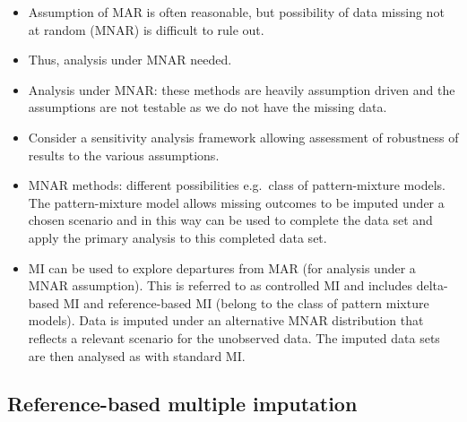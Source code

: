 \documentclass[
  letterpaper,
  DIV=11,
  numbers=noendperiod]{scrreprt}
\providecommand{\tightlist}{%
  \setlength{\itemsep}{0pt}\setlength{\parskip}{0pt}}\usepackage{longtable,booktabs,array}
\begin{document}
\begin{itemize}
\tightlist
\item
  Assumption of MAR is often reasonable, but possibility of data missing
  not at random (MNAR) is difficult to rule out.
\item
  Thus, analysis under MNAR needed.
\item
  Analysis under MNAR: these methods are heavily assumption driven and
  the assumptions are not testable as we do not have the missing data.
\item
  Consider a sensitivity analysis framework allowing assessment of
  robustness of results to the various assumptions.
\item
  MNAR methods: different possibilities e.g.~class of pattern-mixture
  models. The pattern-mixture model allows missing outcomes to be
  imputed under a chosen scenario and in this way can be used to
  complete the data set and apply the primary analysis to this completed
  data set.
\item
  MI can be used to explore departures from MAR (for analysis under a
  MNAR assumption). This is referred to as controlled MI and includes
  delta-based MI and reference-based MI (belong to the class of pattern
  mixture models). Data is imputed under an alternative MNAR
  distribution that reflects a relevant scenario for the unobserved
  data. The imputed data sets are then analysed as with standard MI.
\end{itemize}

\hypertarget{reference-based-multiple-imputation}{%
\subsection{Reference-based multiple
imputation}\label{reference-based-multiple-imputation}}
\end{document}
